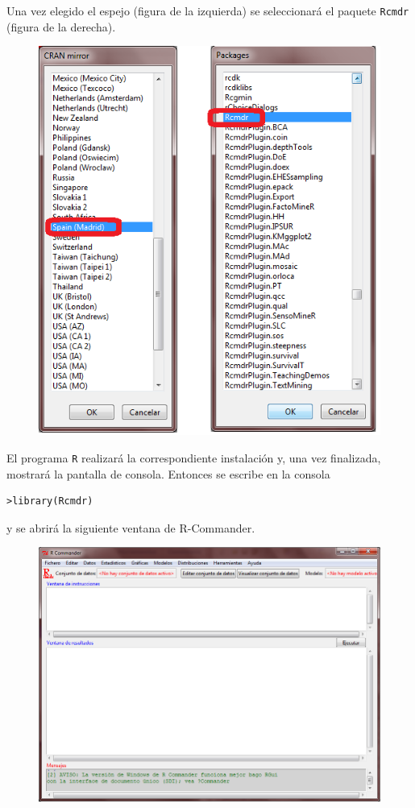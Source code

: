 \documentclass[]{book}
\begin{document}
Una vez elegido el espejo (figura de la izquierda) se seleccionará el
paquete \texttt{Rcmdr} (figura de la derecha).

\begin{figure}
\centering
\includegraphics{figuras/Rcommander2.png}
\caption{}
\end{figure}

El programa \texttt{R} realizará la correspondiente instalación y, una
vez finalizada, mostrará la pantalla de consola. Entonces se escribe en
la consola

\begin{verbatim}
>library(Rcmdr)
\end{verbatim}

y se abrirá la siguiente ventana de R-Commander.

\begin{figure}
\centering
\includegraphics{figuras/Rcommander3.png}
\caption{}
\end{figure}
\end{document}
